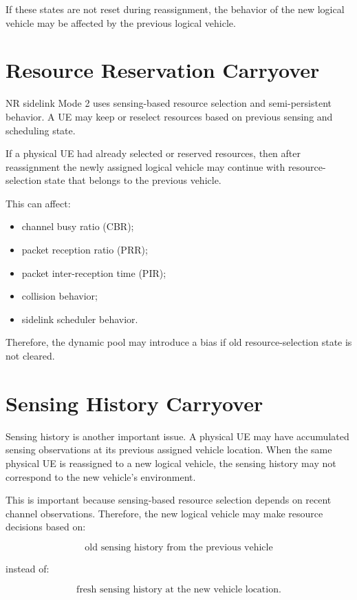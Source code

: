 \documentclass[11pt]{article}
\begin{document}
If these states are not reset during reassignment, the behavior of the new logical vehicle may be affected by the previous logical vehicle.

\section{Resource Reservation Carryover}

NR sidelink Mode 2 uses sensing-based resource selection and semi-persistent behavior. A UE may keep or reselect resources based on previous sensing and scheduling state.

If a physical UE had already selected or reserved resources, then after reassignment the newly assigned logical vehicle may continue with resource-selection state that belongs to the previous vehicle.

This can affect:

\begin{itemize}
    \item channel busy ratio (CBR);
    \item packet reception ratio (PRR);
    \item packet inter-reception time (PIR);
    \item collision behavior;
    \item sidelink scheduler behavior.
\end{itemize}

Therefore, the dynamic pool may introduce a bias if old resource-selection state is not cleared.

\section{Sensing History Carryover}

Sensing history is another important issue. A physical UE may have accumulated sensing observations at its previous assigned vehicle location. When the same physical UE is reassigned to a new logical vehicle, the sensing history may not correspond to the new vehicle's environment.

This is important because sensing-based resource selection depends on recent channel observations. Therefore, the new logical vehicle may make resource decisions based on:

\[
\text{old sensing history from the previous vehicle}
\]

instead of:

\[
\text{fresh sensing history at the new vehicle location}.
\]
\end{document}
